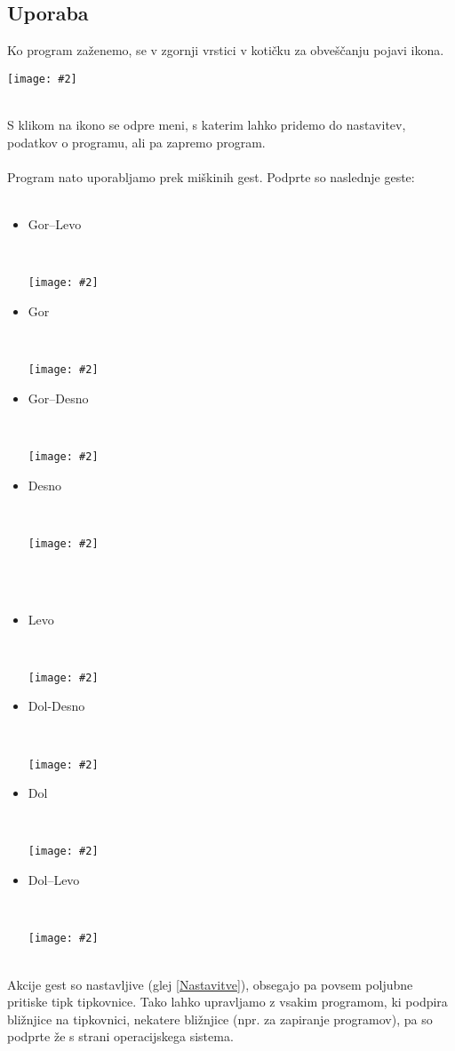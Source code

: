 \documentclass[10pt,a4paper,oneside]{book}
\newcommand\inline[1]{%
\begin{Sbox}{#1}\end{Sbox}%
\colorbox{lightgray}{\TheSbox}%
}
\newcommand\pic[2]{%
\parbox{1cm}{%
\begin{center}%
\texttt{[image: \#2]}%
\end{center}%
}%
}
\newcommand\br{%
 \ \\ \ \\%
}
\begin{document}
\subsection{Uporaba}
Ko program zaženemo, se v zgornji vrstici v kotičku za obveščanju pojavi ikona.\\
\pic{0.9}{./gmsAppindicator.png}\\
S klikom na ikono se odpre meni, s katerim lahko pridemo do nastavitev, podatkov o programu, ali pa zapremo program.
\br
Program nato uporabljamo prek miškinih gest. Podprte so naslednje geste:
\br
\begin{minipage}{6cm}
\begin{itemize}
\item \inline{Gor--Levo}\\
\pic{0.2}{./upleft.png}
\item \inline{Gor}\\
\pic{0.2}{./up.png}
\item \inline{Gor--Desno}\\
\pic{0.2}{./upright.png}
\end{itemize}
\end{minipage}
\begin{minipage}{6cm}
\begin{itemize}
\item \inline{Desno}\\
\pic{0.2}{./right.png}
\br
\item \inline{Levo}\\
\pic{0.2}{./left.png}
\end{itemize}
\end{minipage}
\begin{minipage}{6cm}
\begin{itemize}
\item \inline{Dol-Desno}\\
\pic{0.2}{./downright.png}
\item \inline{Dol}\\
\pic{0.2}{./down.png}
\item \inline{Dol--Levo}\\
\pic{0.2}{./downleft.png}
\end{itemize}
\end{minipage}\\
Akcije gest so nastavljive (glej \ref{Nastavitve}), obsegajo pa povsem poljubne pritiske tipk tipkovnice. Tako lahko upravljamo z vsakim programom, ki podpira bližnjice na tipkovnici, nekatere bližnjice (npr. za zapiranje programov), pa so podprte že s strani operacijskega sistema.
\newpage
\end{document}
